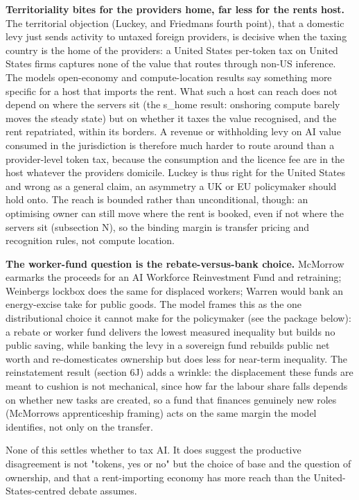 \documentclass[11pt]{article}
\begin{document}
\textbf{Territoriality bites for the provider\textquotesingle s home,
far less for the rent\textquotesingle s host.} The territorial objection
(Luckey, and Friedman\textquotesingle s fourth point), that a domestic
levy just sends activity to untaxed foreign providers, is decisive when
the taxing country is the home of the providers: a United States
per-token tax on United States firms captures none of the value that
routes through non-US inference. The model\textquotesingle s
open-economy and compute-location results say something more specific
for a host that imports the rent. What such a host can reach does not
depend on where the servers sit (the s\_home result: onshoring compute
barely moves the steady state) but on whether it taxes the value
recognised, and the rent repatriated, within its borders. A revenue or
withholding levy on AI value consumed in the jurisdiction is therefore
much harder to route around than a provider-level token tax, because the
consumption and the licence fee are in the host whatever the
provider\textquotesingle s domicile. Luckey is thus right for the United
States and wrong as a general claim, an asymmetry a UK or EU policymaker
should hold onto. The reach is bounded rather than unconditional,
though: an optimising owner can still move where the rent is booked,
even if not where the servers sit (subsection N), so the binding margin
is transfer pricing and recognition rules, not compute location.

\textbf{The worker-fund question is the rebate-versus-bank choice.}
McMorrow earmarks the proceeds for an AI Workforce Reinvestment Fund and
retraining; Weinberg\textquotesingle s lockbox does the same for
displaced workers; Warren would bank an energy-excise take for public
goods. The model frames this as the one distributional choice it cannot
make for the policymaker (see the package below): a rebate or worker
fund delivers the lowest measured inequality but builds no public
saving, while banking the levy in a sovereign fund rebuilds public net
worth and re-domesticates ownership but does less for near-term
inequality. The reinstatement result (section 6J) adds a wrinkle: the
displacement these funds are meant to cushion is not mechanical, since
how far the labour share falls depends on whether new tasks are created,
so a fund that finances genuinely new roles (McMorrow\textquotesingle s
apprenticeship framing) acts on the same margin the model identifies,
not only on the transfer.

None of this settles whether to tax AI. It does suggest the productive
disagreement is not "tokens, yes or no" but the choice of base and the
question of ownership, and that a rent-importing economy has more reach
than the United-States-centred debate assumes.
\end{document}
